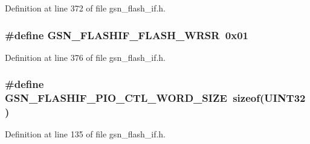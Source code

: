 Definition at line 372 of file gsn\_\-flash\_\-if.h.

\hypertarget{a00501_ab03bcf572199fc61a6f64a7446961708}{
\subsubsection[{GSN\_\-FLASHIF\_\-FLASH\_\-WRSR}]{\setlength{\rightskip}{0pt plus 5cm}\#define GSN\_\-FLASHIF\_\-FLASH\_\-WRSR~0x01}}
\label{a00501_ab03bcf572199fc61a6f64a7446961708}


Definition at line 376 of file gsn\_\-flash\_\-if.h.

\hypertarget{a00501_a4649957b3872f85bd4ef576eb9b3870e}{
\subsubsection[{GSN\_\-FLASHIF\_\-PIO\_\-CTL\_\-WORD\_\-SIZE}]{\setlength{\rightskip}{0pt plus 5cm}\#define GSN\_\-FLASHIF\_\-PIO\_\-CTL\_\-WORD\_\-SIZE~sizeof({\bf UINT32})}}
\label{a00501_a4649957b3872f85bd4ef576eb9b3870e}


Definition at line 135 of file gsn\_\-flash\_\-if.h.



